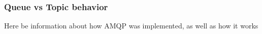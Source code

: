 \subsubsection{Queue vs Topic behavior}

Here be information about how AMQP was implemented, as well as how it works

\clearpage

%

